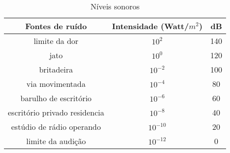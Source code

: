 \begin{table}[ht]
\centering
\begin{tabular}{|c|c|c|}
\hline
Fontes de ruído & Intensidade (Watt/$m^{2}$) & dB\\
\hline
limite da dor & $10^{2}$ & 140\\
jato & $10^{0}$ & 120\\
britadeira & $10^{-2}$ & 100\\
via movimentada & $10^{-4}$ & 80\\
barulho de escritório & $10^{-6}$ & 60\\
escritório privado residencia & $10^{-8}$ & 40\\
estúdio de rádio operando & $10^{-10}$ & 20\\
limite da audição & $10^{-12}$ & 0\\
\hline
\end{tabular}
\caption{Níveis sonoros}
\end{table}
